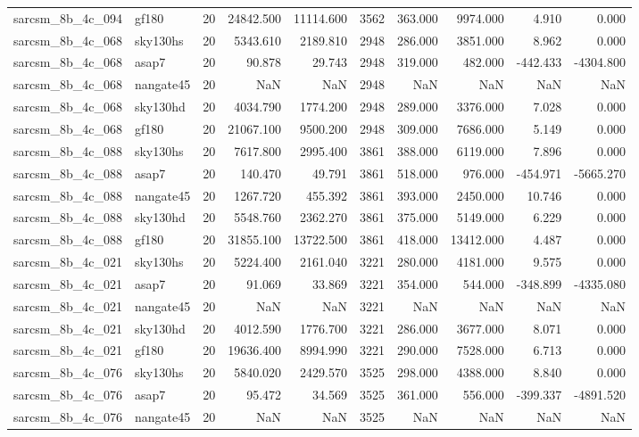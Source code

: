 \documentclass{article}
\begin{document}
\begin{longtable}{llrrrrrrrr}
sarcsm\_8b\_4c\_094 & gf180 & 20 & 24842.500 & 11114.600 & 3562 & 363.000 & 9974.000 & 4.910 & 0.000 \\
sarcsm\_8b\_4c\_068 & sky130hs & 20 & 5343.610 & 2189.810 & 2948 & 286.000 & 3851.000 & 8.962 & 0.000 \\
sarcsm\_8b\_4c\_068 & asap7 & 20 & 90.878 & 29.743 & 2948 & 319.000 & 482.000 & -442.433 & -4304.800 \\
sarcsm\_8b\_4c\_068 & nangate45 & 20 & NaN & NaN & 2948 & NaN & NaN & NaN & NaN \\
sarcsm\_8b\_4c\_068 & sky130hd & 20 & 4034.790 & 1774.200 & 2948 & 289.000 & 3376.000 & 7.028 & 0.000 \\
sarcsm\_8b\_4c\_068 & gf180 & 20 & 21067.100 & 9500.200 & 2948 & 309.000 & 7686.000 & 5.149 & 0.000 \\
sarcsm\_8b\_4c\_088 & sky130hs & 20 & 7617.800 & 2995.400 & 3861 & 388.000 & 6119.000 & 7.896 & 0.000 \\
sarcsm\_8b\_4c\_088 & asap7 & 20 & 140.470 & 49.791 & 3861 & 518.000 & 976.000 & -454.971 & -5665.270 \\
sarcsm\_8b\_4c\_088 & nangate45 & 20 & 1267.720 & 455.392 & 3861 & 393.000 & 2450.000 & 10.746 & 0.000 \\
sarcsm\_8b\_4c\_088 & sky130hd & 20 & 5548.760 & 2362.270 & 3861 & 375.000 & 5149.000 & 6.229 & 0.000 \\
sarcsm\_8b\_4c\_088 & gf180 & 20 & 31855.100 & 13722.500 & 3861 & 418.000 & 13412.000 & 4.487 & 0.000 \\
sarcsm\_8b\_4c\_021 & sky130hs & 20 & 5224.400 & 2161.040 & 3221 & 280.000 & 4181.000 & 9.575 & 0.000 \\
sarcsm\_8b\_4c\_021 & asap7 & 20 & 91.069 & 33.869 & 3221 & 354.000 & 544.000 & -348.899 & -4335.080 \\
sarcsm\_8b\_4c\_021 & nangate45 & 20 & NaN & NaN & 3221 & NaN & NaN & NaN & NaN \\
sarcsm\_8b\_4c\_021 & sky130hd & 20 & 4012.590 & 1776.700 & 3221 & 286.000 & 3677.000 & 8.071 & 0.000 \\
sarcsm\_8b\_4c\_021 & gf180 & 20 & 19636.400 & 8994.990 & 3221 & 290.000 & 7528.000 & 6.713 & 0.000 \\
sarcsm\_8b\_4c\_076 & sky130hs & 20 & 5840.020 & 2429.570 & 3525 & 298.000 & 4388.000 & 8.840 & 0.000 \\
sarcsm\_8b\_4c\_076 & asap7 & 20 & 95.472 & 34.569 & 3525 & 361.000 & 556.000 & -399.337 & -4891.520 \\
sarcsm\_8b\_4c\_076 & nangate45 & 20 & NaN & NaN & 3525 & NaN & NaN & NaN & NaN \\

\end{longtable}
\end{document}
